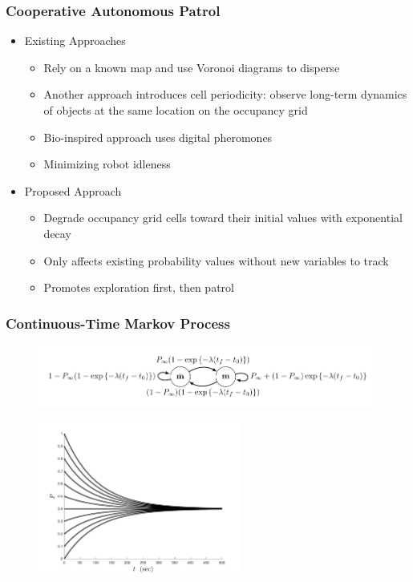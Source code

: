 \documentclass[11pt,professionalfonts,hyperref={pdftex,pdfpagemode=none,pdfstartview=FitH}]{beamer}
\begin{document}
\begin{frame}
\frametitle{Cooperative Autonomous Patrol}

\begin{itemize}
	\item Existing Approaches
	\begin{itemize}
		\item Rely on a known map and use Voronoi diagrams to disperse
		\item Another approach introduces cell periodicity: observe long-term dynamics of objects at the same location on the occupancy grid
		\item Bio-inspired approach uses digital pheromones 
		\item Minimizing robot idleness
	\end{itemize}
	\pause
	\item Proposed Approach
	\begin{itemize}
		\item Degrade occupancy grid cells toward their initial values with exponential decay
		\item Only affects existing probability values without new variables to track
		\item Promotes exploration first, then patrol
	\end{itemize}
\end{itemize}

\end{frame}

\begin{frame}
\frametitle{Continuous-Time Markov Process}

\begin{figure}
\centering
\includegraphics[width=\textwidth]{markov_diagram_continuous.pdf}
\end{figure}

\begin{figure}
\centering
\includegraphics[width=0.6\textwidth]{DegradeExamples.pdf}
\end{figure}

\end{frame}
\end{document}
